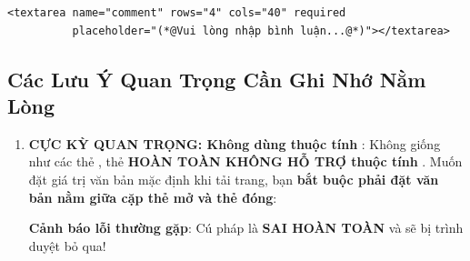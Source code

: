 \begin{codeWindow}
\begin{lstlisting}[language=HTML5]
<textarea name="comment" rows="4" cols="40" required 
          placeholder="(*@Vui lòng nhập bình luận...@*)"></textarea>
\end{lstlisting}
\end{codeWindow}

\subsection{Các Lưu Ý Quan Trọng Cần Ghi Nhớ Nằm Lòng}

\begin{warnBox}
\begin{enumerate}[leftmargin=1.5em, itemsep=6pt, parsep=0pt]
    \item \textbf{CỰC KỲ QUAN TRỌNG: Không dùng thuộc tính }:
    Không giống như các thẻ , thẻ  \textbf{HOÀN TOÀN KHÔNG HỖ TRỢ thuộc tính }. Muốn đặt giá trị văn bản mặc định khi tải trang, bạn \textbf{bắt buộc phải đặt văn bản nằm giữa cặp thẻ mở và thẻ đóng}:
    \par\vspace{4pt}
    \begin{center}
    \tcbox[on line, arc=3pt, colback=primaryBlue!8, colframe=primaryBlue!40, boxsep=3pt, left=10pt, right=10pt, top=4pt, bottom=4pt]{%
      \small\ttfamily\bfseries \textcolor{primaryBlue}{<textarea>}\textcolor{black}{Văn bản giá trị mặc định}\textcolor{primaryBlue}{</textarea>}%
    }
    \end{center}
    \par\vspace{2pt}
    \textcolor{red!80!black}{\textbf{Cảnh báo lỗi thường gặp}}: Cú pháp  là \textbf{SAI HOÀN TOÀN} và sẽ bị trình duyệt bỏ qua!


\end{enumerate}
\end{warnBox}
